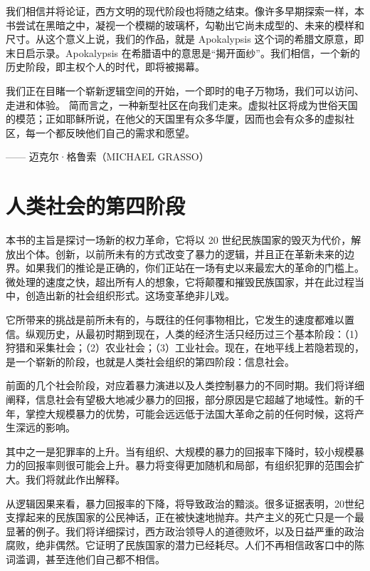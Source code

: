 我们相信并将论证，西方文明的现代阶段也将随之结束。像许多早期探索一样，本书尝试在黑暗之中，凝视一个模糊的玻璃杯，勾勒出它尚未成型的、未来的模样和尺寸。从这个意义上说，我们的作品，就是 Apokalypsis 这个词的希腊文原意，即末日启示录。Apokalypsis 在希腊语中的意思是“揭开面纱”。我们相信，一个新的历史阶段，即主权个人的时代，即将被揭幕。


\begin{tcolorbox}
我们正在目睹一个崭新逻辑空间的开始，一个即时的电子万物场，我们可以访问、走进和体验。
简而言之，一种新型社区在向我们走来。虚拟社区将成为世俗天国的模范；正如耶稣所说，在他父的天国里有众多华厦，因而也会有众多的虚拟社区，每一个都反映他们自己的需求和愿望。
\begin{flushright}
—— 迈克尔·格鲁索（MICHAEL GRASSO）
\end{flushright}
\end{tcolorbox}

\section{人类社会的第四阶段}
本书的主旨是探讨一场新的权力革命，它将以 20 世纪民族国家的毁灭为代价，解放出个体。创新，以前所未有的方式改变了暴力的逻辑，并且正在革新未来的边界。如果我们的推论是正确的，你们正站在一场有史以来最宏大的革命的门槛上。微处理的速度之快，超出所有人的想象，它将颠覆和摧毁民族国家，并在此过程当中，创造出新的社会组织形式。这场变革绝非儿戏。


它所带来的挑战是前所未有的，与既往的任何事物相比，它发生的速度都难以置信。纵观历史，从最初时期到现在，人类的经济生活只经历过三个基本阶段：（1）狩猎和采集社会；（2）农业社会；（3）工业社会。现在，在地平线上若隐若现的，是一个崭新的阶段，也就是人类社会组织的第四阶段：信息社会。


前面的几个社会阶段，对应着暴力演进以及人类控制暴力的不同时期。我们将详细阐释，信息社会有望极大地减少暴力的回报，部分原因是它超越了地域性。新的千年，掌控大规模暴力的优势，可能会远远低于法国大革命之前的任何时候，这将产生深远的影响。



其中之一是犯罪率的上升。当有组织、大规模的暴力的回报率下降时，较小规模暴力的回报率则很可能会上升。暴力将变得更加随机和局部，有组织犯罪的范围会扩大。我们将就此作出解释。



从逻辑因果来看，暴力回报率的下降，将导致政治的黯淡。很多证据表明，20世纪支撑起来的民族国家的公民神话，正在被快速地抛弃。共产主义的死亡只是一个最显著的例子。我们将详细探讨，西方政治领导人的道德败坏，以及日益严重的政治腐败，绝非偶然。它证明了民族国家的潜力已经耗尽。人们不再相信政客口中的陈词滥调，甚至连他们自己都不相信。



